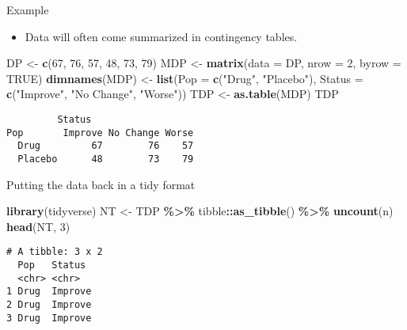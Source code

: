 \documentclass[
  ignorenonframetext,
]{beamer}
\newenvironment{Shaded}{\begin{snugshade}}{\end{snugshade}}
\newcommand{\AttributeTok}[1]{\textcolor[rgb]{0.13,0.29,0.53}{#1}}
\newcommand{\ConstantTok}[1]{\textcolor[rgb]{0.56,0.35,0.01}{#1}}
\newcommand{\DecValTok}[1]{\textcolor[rgb]{0.00,0.00,0.81}{#1}}
\newcommand{\FunctionTok}[1]{\textcolor[rgb]{0.13,0.29,0.53}{\textbf{#1}}}
\newcommand{\NormalTok}[1]{#1}
\newcommand{\OtherTok}[1]{\textcolor[rgb]{0.56,0.35,0.01}{#1}}
\newcommand{\SpecialCharTok}[1]{\textcolor[rgb]{0.81,0.36,0.00}{\textbf{#1}}}
\newcommand{\StringTok}[1]{\textcolor[rgb]{0.31,0.60,0.02}{#1}}
\providecommand{\tightlist}{%
  \setlength{\itemsep}{0pt}\setlength{\parskip}{0pt}}
\begin{document}
\begin{frame}[fragile]{Example}
\protect\hypertarget{example-2}{}
\begin{itemize}
\tightlist
\item
  Data will often come summarized in contingency tables.
\end{itemize}

\begin{Shaded}
\begin{Highlighting}[]
\NormalTok{DP }\OtherTok{\textless{}{-}} \FunctionTok{c}\NormalTok{(}\DecValTok{67}\NormalTok{, }\DecValTok{76}\NormalTok{, }\DecValTok{57}\NormalTok{, }\DecValTok{48}\NormalTok{, }\DecValTok{73}\NormalTok{, }\DecValTok{79}\NormalTok{)}
\NormalTok{MDP }\OtherTok{\textless{}{-}} \FunctionTok{matrix}\NormalTok{(}\AttributeTok{data =}\NormalTok{ DP, }\AttributeTok{nrow =} \DecValTok{2}\NormalTok{, }\AttributeTok{byrow =} \ConstantTok{TRUE}\NormalTok{)}
\FunctionTok{dimnames}\NormalTok{(MDP) }\OtherTok{\textless{}{-}} \FunctionTok{list}\NormalTok{(}\AttributeTok{Pop =} \FunctionTok{c}\NormalTok{(}\StringTok{"Drug"}\NormalTok{, }\StringTok{"Placebo"}\NormalTok{), }
    \AttributeTok{Status =} \FunctionTok{c}\NormalTok{(}\StringTok{"Improve"}\NormalTok{, }\StringTok{"No Change"}\NormalTok{, }\StringTok{"Worse"}\NormalTok{))}
\NormalTok{TDP }\OtherTok{\textless{}{-}} \FunctionTok{as.table}\NormalTok{(MDP)}
\NormalTok{TDP}
\end{Highlighting}
\end{Shaded}

\begin{verbatim}
         Status
Pop       Improve No Change Worse
  Drug         67        76    57
  Placebo      48        73    79
\end{verbatim}
\end{frame}

\begin{frame}[fragile]{Putting the data back in a tidy format}
\protect\hypertarget{putting-the-data-back-in-a-tidy-format}{}
\begin{Shaded}
\begin{Highlighting}[]
\FunctionTok{library}\NormalTok{(tidyverse)}
\NormalTok{NT }\OtherTok{\textless{}{-}}\NormalTok{ TDP }\SpecialCharTok{\%\textgreater{}\%} 
\NormalTok{  tibble}\SpecialCharTok{::}\FunctionTok{as\_tibble}\NormalTok{() }\SpecialCharTok{\%\textgreater{}\%} 
  \FunctionTok{uncount}\NormalTok{(n)}
\FunctionTok{head}\NormalTok{(NT, }\DecValTok{3}\NormalTok{)}
\end{Highlighting}
\end{Shaded}

\begin{verbatim}
# A tibble: 3 x 2
  Pop   Status 
  <chr> <chr>  
1 Drug  Improve
2 Drug  Improve
3 Drug  Improve
\end{verbatim}
\end{frame}
\end{document}
